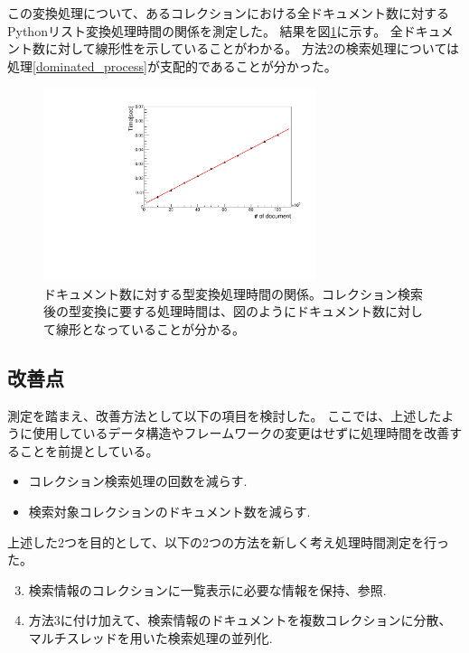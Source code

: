 この変換処理について、あるコレクションにおける全ドキュメント数に対するPythonリスト変換処理時間の関係を測定した。
結果を図\ref{dominated_process_relation}に示す。
全ドキュメント数に対して線形性を示していることがわかる。
方法2の検索処理については処理\ref{dominated_process}が支配的であることが分かった。
\begin{figure}[bpt]
  \begin{center}
    \includegraphics[width=8cm,angle=270]{./dominated_process_relation.pdf}
  \caption[ドキュメント数に対する型変換処理時間の関係]{ドキュメント数に対する型変換処理時間の関係。コレクション検索後の型変換に要する処理時間は、図のようにドキュメント数に対して線形となっていることが分かる。}
  \label{dominated_process_relation}
  \end{center}
\end{figure}

\subsection{改善点}

測定を踏まえ、改善方法として以下の項目を検討した。
ここでは、上述したように使用しているデータ構造やフレームワークの変更はせずに処理時間を改善することを前提としている。
\begin{itemize}
  \item コレクション検索処理の回数を減らす.
  \item 検索対象コレクションのドキュメント数を減らす.
\end{itemize}

上述した2つを目的として、以下の2つの方法を新しく考え処理時間測定を行った。

\begin{enumerate}
  \setcounter{enumi}{2}
  \item 検索情報のコレクションに一覧表示に必要な情報を保持、参照.
  \item 方法3に付け加えて、検索情報のドキュメントを複数コレクションに分散、マルチスレッドを用いた検索処理の並列化.
\end{enumerate}

